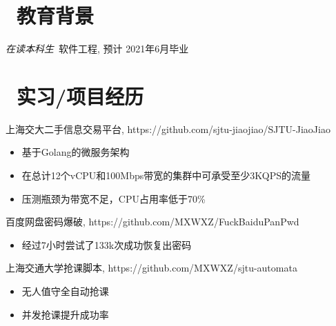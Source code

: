 \documentclass{resume}
\begin{document}



\section{\faGraduationCap\  教育背景}
\textit{在读本科生}\ 软件工程, 预计 2021年6月毕业

\section{\faUsers\ 实习/项目经历}
\begin{onehalfspacing}
    上海交大二手信息交易平台, https://github.com/sjtu-jiaojiao/SJTU-JiaoJiao
    \begin{itemize}
        \item 基于Golang的微服务架构
        \item 在总计12个vCPU和100Mbps带宽的集群中可承受至少3KQPS的流量
        \item 压测瓶颈为带宽不足，CPU占用率低于70\%
    \end{itemize}
\end{onehalfspacing}

\begin{onehalfspacing}
    百度网盘密码爆破, https://github.com/MXWXZ/FuckBaiduPanPwd
    \begin{itemize}
        \item 经过7小时尝试了133k次成功恢复出密码
    \end{itemize}
\end{onehalfspacing}

\begin{onehalfspacing}
    上海交通大学抢课脚本, https://github.com/MXWXZ/sjtu-automata
    \begin{itemize}
        \item 无人值守全自动抢课
        \item 并发抢课提升成功率
    \end{itemize}
\end{onehalfspacing}
\end{document}
